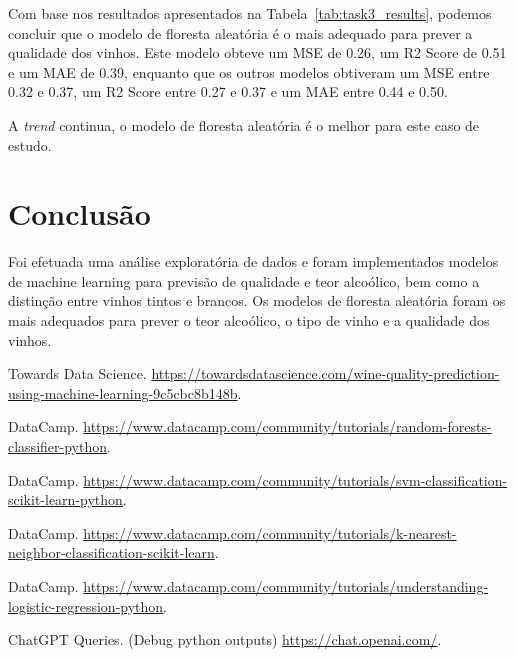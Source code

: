 \documentclass{article}
\begin{document}
    Com base nos resultados apresentados na Tabela~\ref{tab:task3_results}, podemos concluir que o modelo de floresta aleatória é o mais adequado para prever a qualidade dos vinhos. Este modelo obteve um MSE de 0.26, um R2 Score de 0.51 e um MAE de 0.39, enquanto que os outros modelos obtiveram um MSE entre 0.32 e 0.37, um R2 Score entre 0.27 e 0.37 e um MAE entre 0.44 e 0.50.

    A \textit{trend} continua, o modelo de floresta aleatória é o melhor para este caso de estudo.


    \section{Conclusão}
    Foi efetuada uma análise exploratória de dados e foram implementados modelos de machine learning para previsão de qualidade e teor alcoólico, bem como a distinção entre vinhos tintos e brancos. Os modelos de floresta aleatória foram os mais adequados para prever o teor alcoólico, o tipo de vinho e a qualidade dos vinhos.

    \newpage

    \begin{thebibliography}{9}

        Towards Data Science.
        \url{https://towardsdatascience.com/wine-quality-prediction-using-machine-learning-9c5cbc8b148b}.

        DataCamp.
        \url{https://www.datacamp.com/community/tutorials/random-forests-classifier-python}.

        DataCamp.
        \url{https://www.datacamp.com/community/tutorials/svm-classification-scikit-learn-python}.

        DataCamp.
        \url{https://www.datacamp.com/community/tutorials/k-nearest-neighbor-classification-scikit-learn}.

        DataCamp.
        \url{https://www.datacamp.com/community/tutorials/understanding-logistic-regression-python}.

        ChatGPT Queries. (Debug python outputs)
        \url{https://chat.openai.com/}.

    \end{thebibliography}
\end{document}
